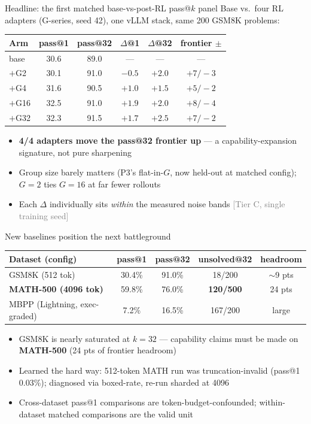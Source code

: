 \documentclass[aspectratio=169,11pt]{beamer}
\newcommand{\good}[1]{\textcolor{green!50!black}{#1}}
\newcommand{\tier}[1]{\hfill{\scriptsize\textcolor{gray}{[#1]}}}
\begin{document}
\begin{frame}{Headline: the first matched base-vs-post-RL pass@$k$ panel}
  Base vs.\ four RL adapters (G-series, seed 42), one vLLM stack, same 200
  GSM8K problems:
  \vspace{4pt}
  \centering
  \begin{tabular}{@{}lccccc@{}}
    \toprule
    Arm & pass@1 & pass@32 & $\Delta$@1 & $\Delta$@32 & frontier $\pm$ \\
    \midrule
    base & 30.6 & 89.0 & --- & --- & --- \\
    $+$G2  & 30.1 & 91.0 & $-0.5$ & \good{$+2.0$} & $+7/-3$ \\
    $+$G4  & 31.6 & 90.5 & $+1.0$ & \good{$+1.5$} & $+5/-2$ \\
    $+$G16 & 32.5 & 91.0 & $+1.9$ & \good{$+2.0$} & $+8/-4$ \\
    $+$G32 & 32.3 & 91.5 & $+1.7$ & \good{$+2.5$} & $+7/-2$ \\
    \bottomrule
  \end{tabular}
  \vspace{6pt}
  \begin{itemize}
    \item \textbf{4/4 adapters move the pass@32 frontier up} --- a
          capability-expansion signature, not pure sharpening
    \item Group size barely matters (P3's flat-in-$G$, now held-out at
          matched config); $G{=}2$ ties $G{=}16$ at far fewer rollouts
    \item Each $\Delta$ individually sits \emph{within} the measured noise
          bands \tier{Tier C, single training seed}
  \end{itemize}
\end{frame}

\begin{frame}{New baselines position the next battleground}
  \centering
  \begin{tabular}{@{}lcccc@{}}
    \toprule
    Dataset (config) & pass@1 & pass@32 & unsolved@32 & headroom \\
    \midrule
    GSM8K (512 tok) & 30.4\% & 91.0\% & 18/200 & $\sim$9 pts \\
    \textbf{MATH-500 (4096 tok)} & 59.8\% & 76.0\% & \textbf{120/500} &
    \good{24 pts} \\
    MBPP (Lightning, exec-graded) & 7.2\% & 16.5\% & 167/200 & large \\
    \bottomrule
  \end{tabular}
  \vspace{6pt}
  \begin{itemize}
    \item GSM8K is nearly saturated at $k{=}32$ --- capability claims must be
          made on \textbf{MATH-500} (24 pts of frontier headroom)
    \item Learned the hard way: 512-token MATH run was truncation-invalid
          (pass@1 0.03\%); diagnosed via boxed-rate, re-run sharded at 4096
    \item Cross-dataset pass@1 comparisons are token-budget-confounded;
          within-dataset matched comparisons are the valid unit
  \end{itemize}
\end{frame}
\end{document}
